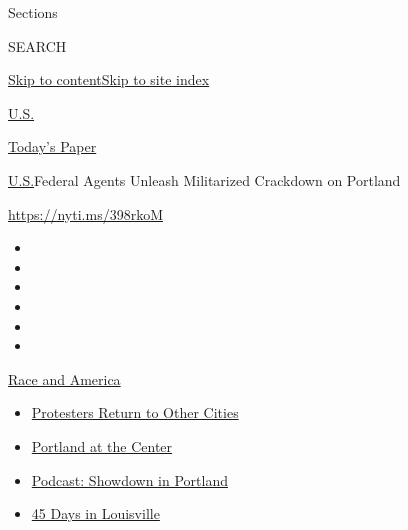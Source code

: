 Sections

SEARCH

\protect\hyperlink{site-content}{Skip to
content}\protect\hyperlink{site-index}{Skip to site index}

\href{https://www.nytimes3xbfgragh.onion/section/us}{U.S.}

\href{https://myaccount.nytimes3xbfgragh.onion/auth/login?response_type=cookie\&client_id=vi}{}

\href{https://www.nytimes3xbfgragh.onion/section/todayspaper}{Today's
Paper}

\href{/section/us}{U.S.}\textbar{}Federal Agents Unleash Militarized
Crackdown on Portland

\url{https://nyti.ms/398rkoM}

\begin{itemize}
\item
\item
\item
\item
\item
\item
\end{itemize}

\href{https://www.nytimes3xbfgragh.onion/news-event/george-floyd-protests-minneapolis-new-york-los-angeles?action=click\&pgtype=Article\&state=default\&region=TOP_BANNER\&context=storylines_menu}{Race
and America}

\begin{itemize}
\tightlist
\item
  \href{https://www.nytimes3xbfgragh.onion/2020/07/26/us/protests-portland-seattle-trump.html?action=click\&pgtype=Article\&state=default\&region=TOP_BANNER\&context=storylines_menu}{Protesters
  Return to Other Cities}
\item
  \href{https://www.nytimes3xbfgragh.onion/2020/07/24/us/portland-oregon-protests-white-race.html?action=click\&pgtype=Article\&state=default\&region=TOP_BANNER\&context=storylines_menu}{Portland
  at the Center}
\item
  \href{https://www.nytimes3xbfgragh.onion/2020/07/23/podcasts/the-daily/portland-protests.html?action=click\&pgtype=Article\&state=default\&region=TOP_BANNER\&context=storylines_menu}{Podcast:
  Showdown in Portland}
\item
  \href{https://www.nytimes3xbfgragh.onion/interactive/2020/07/16/us/black-lives-matter-protests-louisville-breonna-taylor.html?action=click\&pgtype=Article\&state=default\&region=TOP_BANNER\&context=storylines_menu}{45
  Days in Louisville}
\end{itemize}

